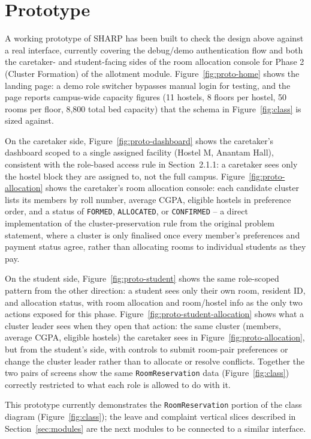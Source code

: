 \documentclass{tietreport}
\begin{document}
\section{Prototype}
\label{sec:prototype}

A working prototype of SHARP has been built to check the design above
against a real interface, currently covering the debug/demo
authentication flow and both the caretaker- and student-facing sides of
the room allocation console for Phase 2 (Cluster Formation) of the
allotment module. Figure~\ref{fig:proto-home} shows the landing page: a
demo role switcher bypasses manual login for testing, and the page
reports campus-wide capacity figures (11 hostels, 8 floors per hostel,
50 rooms per floor, 8,800 total bed capacity) that the schema in
Figure~\ref{fig:class} is sized against.

On the caretaker side, Figure~\ref{fig:proto-dashboard} shows the
caretaker's dashboard scoped to a single assigned facility (Hostel M,
Anantam Hall), consistent with the role-based access rule in
Section~2.1.1: a caretaker sees only the hostel block they are assigned
to, not the full campus. Figure~\ref{fig:proto-allocation} shows the
caretaker's room allocation console: each candidate cluster lists its
members by roll number, average CGPA, eligible hostels in preference
order, and a status of \texttt{FORMED}, \texttt{ALLOCATED}, or
\texttt{CONFIRMED} -- a direct implementation of the cluster-preservation
rule from the original problem statement, where a cluster is only
finalised once every member's preferences and payment status agree,
rather than allocating rooms to individual students as they pay.

On the student side, Figure~\ref{fig:proto-student} shows the same
role-scoped pattern from the other direction: a student sees only their
own room, resident ID, and allocation status, with room allocation and
room/hostel info as the only two actions exposed for this phase.
Figure~\ref{fig:proto-student-allocation} shows what a cluster leader
sees when they open that action: the same cluster (members, average
CGPA, eligible hostels) the caretaker sees in
Figure~\ref{fig:proto-allocation}, but from the student's side, with
controls to submit room-pair preferences or change the cluster leader
rather than to allocate or resolve conflicts. Together the two pairs of
screens show the same \texttt{RoomReservation} data
(Figure~\ref{fig:class}) correctly restricted to what each role is
allowed to do with it.

This prototype currently demonstrates the \texttt{RoomReservation}
portion of the class diagram (Figure~\ref{fig:class}); the leave and
complaint vertical slices described in Section~\ref{sec:modules} are
the next modules to be connected to a similar interface.
\end{document}
